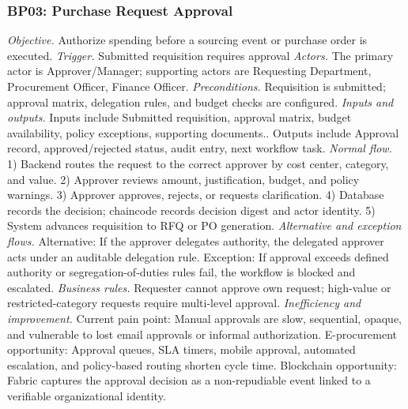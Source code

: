 \documentclass[conference]{IEEEtran}
\begin{document}
\subsubsection{BP03: Purchase Request Approval}
\textit{Objective.} Authorize spending before a sourcing event or purchase order is executed.
\textit{Trigger.} Submitted requisition requires approval
\textit{Actors.} The primary actor is Approver/Manager; supporting actors are Requesting Department, Procurement Officer, Finance Officer.
\textit{Preconditions.} Requisition is submitted; approval matrix, delegation rules, and budget checks are configured.
\textit{Inputs and outputs.} Inputs include Submitted requisition, approval matrix, budget availability, policy exceptions, supporting documents.. Outputs include Approval record, approved/rejected status, audit entry, next workflow task.
\textit{Normal flow.} 1) Backend routes the request to the correct approver by cost center, category, and value. 2) Approver reviews amount, justification, budget, and policy warnings. 3) Approver approves, rejects, or requests clarification. 4) Database records the decision; chaincode records decision digest and actor identity. 5) System advances requisition to RFQ or PO generation.
\textit{Alternative and exception flows.} Alternative: If the approver delegates authority, the delegated approver acts under an auditable delegation rule. Exception: If approval exceeds defined authority or segregation-of-duties rules fail, the workflow is blocked and escalated.
\textit{Business rules.} Requester cannot approve own request; high-value or restricted-category requests require multi-level approval.
\textit{Inefficiency and improvement.} Current pain point: Manual approvals are slow, sequential, opaque, and vulnerable to lost email approvals or informal authorization. E-procurement opportunity: Approval queues, SLA timers, mobile approval, automated escalation, and policy-based routing shorten cycle time. Blockchain opportunity: Fabric captures the approval decision as a non-repudiable event linked to a verifiable organizational identity.
\end{document}
